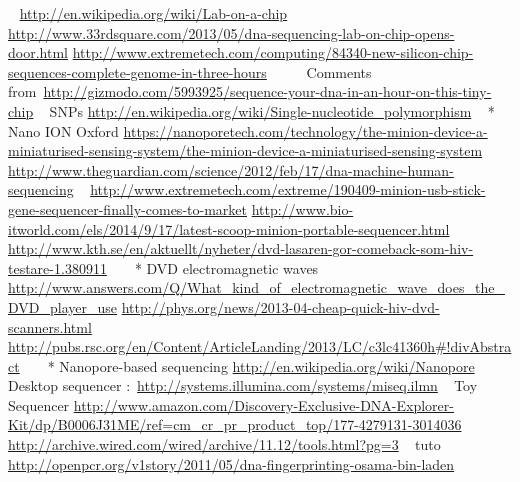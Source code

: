 ~
\url{http://en.wikipedia.org/wiki/Lab-on-a-chip}
\url{http://www.33rdsquare.com/2013/05/dna-sequencing-lab-on-chip-opens-door.html}
\url{http://www.extremetech.com/computing/84340-new-silicon-chip-sequences-complete-genome-in-three-hours}
~
~
~
Comments
from~\url{http://gizmodo.com/5993925/sequence-your-dna-in-an-hour-on-this-tiny-chip}
~
SNPs
\url{http://en.wikipedia.org/wiki/Single-nucleotide_polymorphism}
~
* Nano ION Oxford
\url{https://nanoporetech.com/technology/the-minion-device-a-miniaturised-sensing-system/the-minion-device-a-miniaturised-sensing-system}
\url{http://www.theguardian.com/science/2012/feb/17/dna-machine-human-sequencing}
~
\url{http://www.extremetech.com/extreme/190409-minion-usb-stick-gene-sequencer-finally-comes-to-market}
\url{http://www.bio-itworld.com/els/2014/9/17/latest-scoop-minion-portable-sequencer.html}
~
~
\url{http://www.kth.se/en/aktuellt/nyheter/dvd-lasaren-gor-comeback-som-hiv-testare-1.380911}
~
~
* DVD electromagnetic waves
\url{http://www.answers.com/Q/What_kind_of_electromagnetic_wave_does_the_DVD_player_use}
\url{http://phys.org/news/2013-04-cheap-quick-hiv-dvd-scanners.html}
\url{http://pubs.rsc.org/en/Content/ArticleLanding/2013/LC/c3lc41360h#!divAbstract}
~
~
* Nanopore-based sequencing
\url{http://en.wikipedia.org/wiki/Nanopore}
~
Desktop sequencer :~\url{http://systems.illumina.com/systems/miseq.ilmn}
~
Toy Sequencer
\url{http://www.amazon.com/Discovery-Exclusive-DNA-Explorer-Kit/dp/B0006J31ME/ref=cm_cr_pr_product_top/177-4279131-3014036}
\url{http://archive.wired.com/wired/archive/11.12/tools.html?pg=3}
~
tuto~
\url{http://openpcr.org/v1story/2011/05/dna-fingerprinting-osama-bin-laden}
~
~

